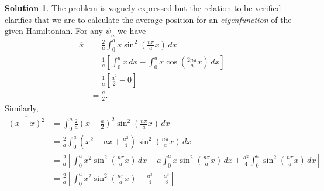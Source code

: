\documentclass[a4paper]{article}
\theoremstyle{definition}
\newtheorem*{sol}{Solution}
\begin{document}
\begin{enumerate}
            \begin{sol}
                The problem is vaguely expressed but the
                relation to be verified clarifies that we
                are to calculate the average position for an
                \textit{eigenfunction} of the given
                Hamiltonian. For any $\psi_n$ we have
                \begin{align}
                    \overline{x}
                    &= \frac{2}{a} \int_{0}^{a} x 
                    \sin^2\left( \frac{n\pi}{a}x \right) \,
                    dx \\
                    &= \frac{1}{a} \left[
                        \int_0^{a} x \, dx
                        - \int_0^{a} x\cos\left(
                        \frac{2n\pi}{a} x \right) \, dx
                    \right] \\
                    &= \frac{1}{a} \left[
                        \frac{a^2}{2} - 0
                    \right] \\
                    &= \frac{a}{2}.
                \end{align}
                Similarly,
                \begin{align}
                    \overline{(x-\overline{x})^2}
                    &= \int_{0}^a \frac{2}{a}
                    \left( x - \frac{a}{2} \right)^2
                    \sin^2\left( \frac{n\pi}{a} x \right) \,
                    dx \\
                    &= \frac{2}{a}
                    \int_0^{a} \left( x^2 - ax +
                    \frac{a^2}{4} \right) \sin^2 \left(
                    \frac{n\pi}{a} x \right) \, dx \\
                    &= \frac{2}{a} \left[
                        \int_0^{a} x^2 \sin^2\left(
                        \frac{n\pi}{a} x \right) \, dx
                        -a \int_0^{a} x \sin^2\left(
                        \frac{n\pi}{a}x \right) \, dx
                        + \frac{a^2}{4} \int_0^{a}
                        \sin^2\left( \frac{n\pi}{a}x \right)
                        \, dx
                    \right] \\
                    &= \frac{2}{a} \left[
                        \int_0^{a} x^2\sin^2\left(
                        \frac{n\pi}{a} x \right) 
                        - \frac{a^3}{4}
                        + \frac{a^3}{8}
                    \right] \\

\end{align}
\end{sol}
\end{enumerate}
\end{document}
